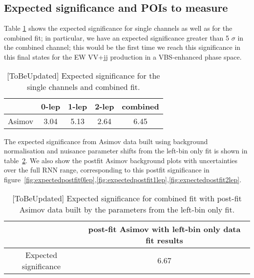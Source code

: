 \clearpage
\subsection{Expected significance and POIs to measure}
\label{sec:fit_significance}

Table \ref{tab:significance} shows the expected significance for single channels
as well as for the combined fit; in particular, we have an expected significance greater than 5 $\sigma$
in the combined channel; this would be the first time we reach this significance in this final states
for the EW VV+jj production in a VBS-enhanced phase space.

\begin{table}[h]
  \centering
  \begin{tabular}{|c|c|c|c|c|}
    \hline
           & 0-lep & 1-lep & 2-lep & combined \\
    \hline    
    Asimov & 3.04 & 5.13 & 2.64 & 6.45 \\
    \hline
  \end{tabular}
  \caption{[ToBeUpdated] Expected significance for the single channels and combined fit.}
  \label{tab:significance}
\end{table}

The expected significance from Asimov data built using background normalisation and nuisance parameter shifts from the left-bin only fit is shown in table~\ref{tab:LBsignificance}. We also show the postfit Asimov background plots with uncertainties over the full RNN range, corresponding to this postfit significance in figure~\ref{fig:expectedpostfit0lep},\ref{fig:expectedpostfit1lep},\ref{fig:expectedpostfit2lep}.
\begin{table}[h]
  \centering
  \begin{tabular}{|c|c|}
    \hline
                                &  post-fit Asimov with left-bin only data fit results\\
    \hline    
    Expected significance       &  6.67  \\
    \hline
  \end{tabular}
  \caption{[ToBeUpdated] Expected significance for combined fit with post-fit Asimov data built by the parameters from the left-bin only fit.}
  \label{tab:LBsignificance}
\end{table}

